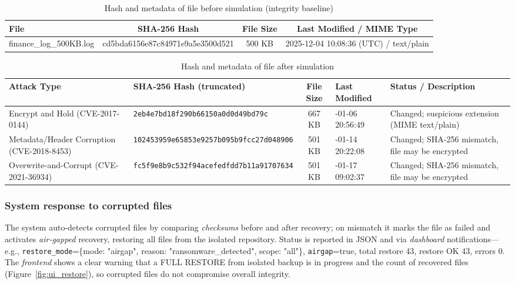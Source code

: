 \documentclass{iaesarticle}
\begin{document}
\begin{table}[H]
\centering
\fontsize{8pt}{10pt}\selectfont
\caption{Hash and metadata of file before simulation (integrity baseline)}
\label{tab:hash_before}
\begin{tabularx}{\textwidth}{@{}X c c c@{}}
\hline
\textbf{File} & \textbf{SHA-256 Hash} & \textbf{File Size} & \textbf{Last Modified / MIME Type} \\
\hline
finance\_log\_500KB.log & cd5bda6156e87c84971e9a5e3500d521 & 500 KB & 2025-12-04 10:08:36 (UTC) / text/plain \\
\hline
\end{tabularx}
\end{table}

\begin{table}[H]
\centering
\fontsize{8pt}{10pt}\selectfont
\caption{Hash and metadata of file after simulation}
\label{tab:hash_after}
\begin{tabularx}{\textwidth}{@{}p{2.3cm} >{\raggedright\arraybackslash}X c >{\raggedright\arraybackslash}p{2.2cm} >{\raggedright\arraybackslash}X@{}}
\hline
\textbf{Attack Type} & \textbf{SHA-256 Hash (truncated)} & \textbf{File Size} & \textbf{Last Modified} & \textbf{Status / Description} \\
\hline
Encrypt and Hold (CVE-2017-0144) & \texttt{2eb4e7bd18f290\-b66150a0d0d49\-bd79c} & 667 KB & 2026-01-06 20:56:49 & Changed; suspicious extension (MIME text/plain) \\
Metadata/Header Corruption (CVE-2018-8453) & \texttt{102453959e6585\-3e9257b095b9\-fcc27d048906} & 501 KB & 2026-01-14 20:22:08 & Changed; SHA-256 mismatch, file may be encrypted \\
Overwrite-and-Corrupt (CVE-2021-36934) & \texttt{fc5f9e8b9c532f\-94acefedfdd7\-b11a91707634} & 501 KB & 2026-01-17 09:02:37 & Changed; SHA-256 mismatch, file may be encrypted \\
\hline
\end{tabularx}
\end{table}

\subsubsection{System response to corrupted files}
The system auto-detects corrupted files by comparing \textit{checksums} before and after recovery; on mismatch it marks the file as failed and activates \textit{air-gapped} recovery, restoring all files from the isolated repository. Status is reported in JSON and via \textit{dashboard} notifications---e.g., \texttt{restore\_mode}=\{mode: "airgap", reason: "ransomware\_detected", scope: "all"\}, \texttt{airgap}=true, total restore 43, restore OK 43, errors 0. The \textit{frontend} shows a clear warning that a FULL RESTORE from isolated backup is in progress and the count of recovered files (Figure~\ref{fig:ui_restore}), so corrupted files do not compromise overall integrity.
\end{document}
